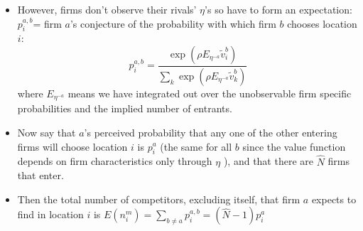 \documentclass[notes=show]{beamer}
\begin{document}
\begin{frame}%


\begin{itemize}
\item However, firms don't observe their rivals' $\eta $'s so have to form
an expectation:\ $p_{i}^{a,b}$= firm $a$'s conjecture of the probability
with which firm $b$ chooses location $i$:%
\begin{equation*}
p_{i}^{a,b}=\frac{\exp (\rho E_{\eta ^{-a}}\tilde{v}_{i}^{b})}{\sum_{k}\exp
(\rho E_{\eta ^{-a}}\tilde{v}_{k}^{b})}
\end{equation*}%
where $E_{\eta ^{-a}}$ means we have integrated out over the unobservable
firm specific probabilities and the implied number of entrants.

\item Now say that $a$'s perceived probability that any one of the other
entering firms will choose location $i$ is $p_{i}^{a}$ (the same for all $b$
since the value function depends on firm characteristics only through $\eta $%
), and that there are $\hat{N}$ firms that enter.

\item Then the total number of competitors, excluding itself, that firm $a$
expects to find in location $i$ is $E(n_{i}^{m})=\sum_{b\neq a}p_{i}^{a,b}=(%
\hat{N}-1)p_{i}^{a}$
\end{itemize}

\end{frame}%
\end{document}
